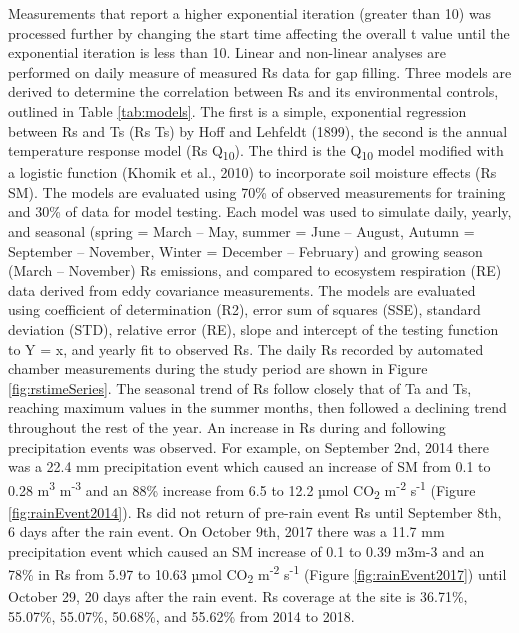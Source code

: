 \documentclass[]{elsarticle} %
\begin{document}
Measurements that report a higher exponential iteration (greater than
10) was processed further by changing the start time affecting the
overall t value until the exponential iteration is less than 10.
\newline \newline Linear and non-linear analyses are performed on daily
measure of measured Rs data for gap filling. Three models are derived to
determine the correlation between Rs and its environmental controls,
outlined in Table \ref {tab:models}. The first is a simple, exponential
regression between Rs and Ts (Rs Ts) by Hoff and Lehfeldt (1899), the
second is the annual temperature response model (Rs
Q\textsubscript{10}). The third is the Q\textsubscript{10} model
modified with a logistic function (Khomik et al., 2010) to incorporate
soil moisture effects (Rs SM). The models are evaluated using 70\% of
observed measurements for training and 30\% of data for model testing.
\newline \newline Each model was used to simulate daily, yearly, and
seasonal (spring = March -- May, summer = June -- August, Autumn =
September -- November, Winter = December -- February) and growing season
(March -- November) Rs emissions, and compared to ecosystem respiration
(RE) data derived from eddy covariance measurements. The models are
evaluated using coefficient of determination (R2), error sum of squares
(SSE), standard deviation (STD), relative error (RE), slope and
intercept of the testing function to Y = x, and yearly fit to observed
Rs. \newline \newline The daily Rs recorded by automated chamber
measurements during the study period are shown in Figure
\ref{fig:rstimeSeries}. The seasonal trend of Rs follow closely that of
Ta and Ts, reaching maximum values in the summer months, then followed a
declining trend throughout the rest of the year. An increase in Rs
during and following precipitation events was observed. For example, on
September 2nd, 2014 there was a 22.4 mm precipitation event which caused
an increase of SM from 0.1 to 0.28 m\textsuperscript{3}
m\textsuperscript{-3} and an 88\% increase from 6.5 to 12.2 µmol
CO\textsubscript{2} m\textsuperscript{-2} s\textsuperscript{-1} (Figure
\ref{fig:rainEvent2014}). \newline \newline Rs did not return of
pre-rain event Rs until September 8th, 6 days after the rain event. On
October 9th, 2017 there was a 11.7 mm precipitation event which caused
an SM increase of 0.1 to 0.39 m3m-3 and an 78\% in Rs from 5.97 to 10.63
µmol CO\textsubscript{2} m\textsuperscript{-2} s\textsuperscript{-1}
(Figure \ref{fig:rainEvent2017}) until October 29, 20 days after the
rain event. Rs coverage at the site is 36.71\%, 55.07\%, 55.07\%,
50.68\%, and 55.62\% from 2014 to 2018.
\end{document}
